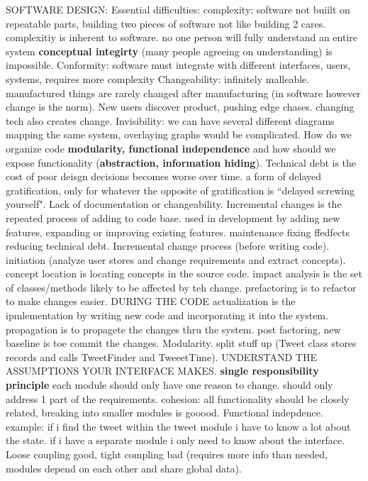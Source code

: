 \documentclass[10pt]{article}
\begin{document}
\begin{landscape}
\begin{multicols*}{6}
SOFTWARE DESIGN:
Essential difficulties: complexity: software not buiilt on repeatable parts, building two pieces of software not like building 2 cares. complexitiy is inherent to software. no one person will fully understand an entire system \textbf{conceptual integirty} (many people agreeing on understanding) is impossible. 
Conformity: software must integrate with different interfaces, users, systems, requires more complexity
Changeability: infinitely malleable. manufactured things are rarely changed after manufacturing (in software however change is the norm). New users discover product, pushing edge chases. changing tech also creates change. 
Invisibility: we can have several different diagrams mapping the same system, overlaying graphs would be complicated. 
How do we organize code \textbf{modularity, functional independence} and how should we expose functionality (\textbf{abstraction, information hiding}). 
Technical debt is the cost of poor deisgn decisions becomes worse over time. a form of delayed gratification, only for whatever the opposite of gratification is ``delayed screwing yourself". Lack of documentation or changeability. 
Incremental changes is the repeated process of adding to code base. used in development by adding new features, expanding or improving existing features. maintenance fixing ffedfects reducing technical debt. 
Incremental change process (before writing code). initiation (analyze user stores and change requirements and extract concepts). concept location is locating concepts in the source code. impact analysis is the set of classes/methods likely to be affected by teh change. prefactoring is to refactor to make changes easier. DURING THE CODE actualization is the ipmlementation by writing new code and incorporating it into the system. propagation is to propagete the changes thru the system. post factoring, new baseline is toe commit the changes. 
Modularity. split stuff up (Tweet class stores records and calls TweetFinder and TweeetTime). UNDERSTAND THE ASSUMPTIONS YOUR INTERFACE MAKES. \textbf{single responsibility principle} each module should only have one reason to change. should only address 1 part of the requirements. cohesion: all functionality should be closely related, breaking into smaller modules is gooood. 
Functional indepdence. example: if i find the tweet within the tweet module i have to know a lot about the state. if i have a separate module i only need to know about the interface. Loose coupling good, tight compling bad (requires more info than needed, modules depend on each other and share global data). 

\end{multicols*}
\end{landscape}
\end{document}

